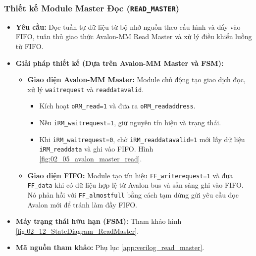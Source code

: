 \subsubsection{Thiết kế Module Master Đọc (\texttt{READ\_MASTER})}
\begin{itemize}
    \item \textbf{Yêu cầu:} Đọc tuần tự dữ liệu từ bộ nhớ nguồn theo cấu hình và đẩy vào FIFO, tuân thủ giao thức Avalon-MM Read Master và xử lý điều khiển luồng từ FIFO.
    \item \textbf{Giải pháp thiết kế (Dựa trên Avalon-MM Master và FSM):}
        \begin{itemize}
            \item \textbf{Giao diện Avalon-MM Master:} Module chủ động tạo giao dịch đọc, xử lý \texttt{waitrequest} và \texttt{readdatavalid}.
            \begin{itemize}
                \item Kích hoạt \texttt{oRM\_read=1} và đưa ra \texttt{oRM\_readaddress}.
                \item Nếu \texttt{iRM\_waitrequest=1}, giữ nguyên tín hiệu và trạng thái.
                \item Khi \texttt{iRM\_waitrequest=0}, chờ \texttt{iRM\_readdatavalid=1} mới lấy dữ liệu \texttt{iRM\_readdata} và ghi vào FIFO. Hình \ref{fig:02_05_avalon_master_read}.
            \end{itemize}
            \item \textbf{Giao diện FIFO:} Module tạo tín hiệu \texttt{FF\_writerequest=1} và đưa \texttt{FF\_data} khi có dữ liệu hợp lệ từ Avalon bus và sẵn sàng ghi vào FIFO. Nó phản hồi với \texttt{FF\_almostfull} bằng cách tạm dừng gửi yêu cầu đọc Avalon mới để tránh làm đầy FIFO.
        \end{itemize}
    \item \textbf{Máy trạng thái hữu hạn (FSM):} Tham khảo hình \ref{fig:02_12_StateDiagram_ReadMaster}.
    \item \textbf{Mã nguồn tham khảo:} Phụ lục \ref{app:verilog_read_master}.
\end{itemize}

